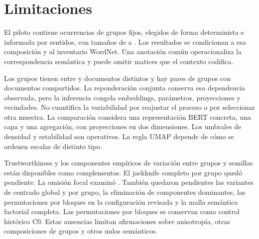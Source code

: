 \section{Limitaciones}
El piloto contiene  ocurrencias de  grupos fijos, elegidos de forma determinista e informada por sentidos, con tamaños de  a . Los resultados se condicionan a esa composición y al inventario WordNet. Una anotación común operacionaliza la correspondencia semántica y puede omitir matices que el contexto codifica.

Los grupos tienen entre  y  documentos distintos y hay  pares de grupos con documentos compartidos. La reponderación conjunta conserva esa dependencia observada, pero la inferencia congela embeddings, parámetros, proyecciones y vecindades. No cuantifica la variabilidad por reajustar el proceso o por seleccionar otra muestra. La comparación considera una representación BERT concreta, una capa y una agregación, con proyecciones en dos dimensiones. Los umbrales de densidad y estabilidad son operativos. La regla UMAP depende de cómo se ordenen escalas de distinto tipo.

Trustworthiness y los componentes empíricos de variación entre grupos y semillas están disponibles como complementos. El jackknife completo por grupo quedó pendiente. La omisión focal examinó . También quedaron pendientes las variantes de centrado global y por grupo, la eliminación de componentes dominantes, las permutaciones por bloques en la configuración revisada y la malla semántica factorial completa. Las permutaciones por bloques se conservan como control histórico C0. Estas ausencias limitan afirmaciones sobre anisotropía, otras composiciones de grupos y otros nulos semánticos.
